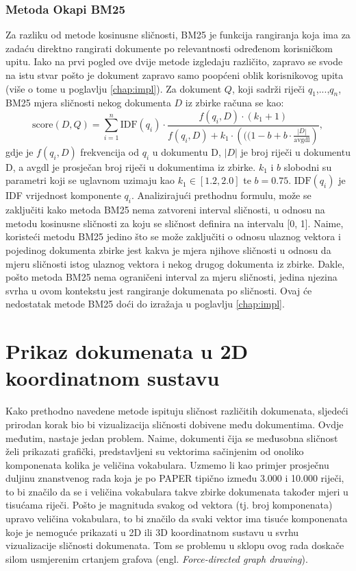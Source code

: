 \documentclass[times, utf8, zavrsni]{fer}
\begin{document}
\subsection{Metoda Okapi BM25}
Za razliku od metode kosinusne sličnosti, BM25 je funkcija rangiranja koja ima za zadaću direktno rangirati dokumente po relevantnosti određenom korisničkom upitu. Iako na prvi pogled ove dvije metode izgledaju različito, zapravo se svode na istu stvar pošto je dokument zapravo samo poopćeni oblik korisnikovog upita (više o tome u poglavlju \ref{chap:impl}).
Za dokument $Q$, koji sadrži riječi $q_{1}$,...,$q_{n}$, BM25 mjera sličnosti nekog dokumenta $D$ iz zbirke računa se kao:
\begin{equation}
{\displaystyle {\text{score}}(D,Q)=\sum _{i=1}^{n}{\text{IDF}}(q_{i})\cdot {\frac {f(q_{i},D)\cdot (k_{1}+1)}{f(q_{i},D)+k_{1}\cdot \left(((1-b+b\cdot {\frac {|D|}{\text{avgdl}}}\right)}},}
\end{equation}
gdje je ${\displaystyle f(q_{i},D)}$	 frekvencija od ${\displaystyle q_{i}}$ u dokumentu D, ${\displaystyle |D|}$ je broj riječi u dokumentu D, a avgdl je prosječan broj riječi u dokumentima iz zbirke. ${\displaystyle k_{1}}$ i $b$ slobodni su parametri koji se uglavnom uzimaju kao ${\displaystyle k_{1}\in [1.2,2.0]}$ te ${\displaystyle b=0.75}.{\displaystyle {\text{ IDF}}(q_{i})}$ je IDF vrijednost komponente ${\displaystyle q_{i}}$.
Analizirajući prethodnu formulu, može se zaključiti kako metoda BM25 nema zatvoreni interval sličnosti, u odnosu na metodu kosinusne sličnosti za koju se sličnost definira na intervalu [0, 1]. Naime, koristeći metodu BM25 jedino što se može zaključiti o odnosu ulaznog vektora i pojedinog dokumenta zbirke jest kakva je mjera njihove sličnosti u odnosu da mjeru sličnosti istog ulaznog vektora i nekog drugog dokumenta iz zbirke. Dakle, pošto metoda BM25 nema ograničeni interval za mjeru sličnosti, jedina njezina svrha u ovom kontekstu jest rangiranje dokumenata po sličnosti. Ovaj će nedostatak metode BM25 doći do izražaja u poglavlju \ref{chap:impl}.

\chapter{Prikaz dokumenata u 2D koordinatnom sustavu}
Kako prethodno navedene metode ispituju sličnost različitih dokumenata, sljedeći prirodan korak bio bi vizualizacija  sličnosti dobivene među dokumentima. Ovdje međutim, nastaje jedan problem. Naime, dokumenti čija se međusobna sličnost želi prikazati grafički, predstavljeni su vektorima sačinjenim od onoliko komponenata kolika je veličina vokabulara. Uzmemo li kao primjer prosječnu duljinu znanstvenog rada koja je po PAPER tipično između 3.000 i 10.000 riječi, to bi značilo da se i veličina vokabulara takve zbirke dokumenata također mjeri u tisućama riječi. Pošto je magnituda svakog od vektora (tj. broj komponenata) upravo veličina vokabulara, to bi značilo da svaki vektor ima tisuće komponenata koje je nemoguće prikazati u 2D ili 3D koordinatnom sustavu u svrhu vizualizacije sličnosti dokumenata. Tom se problemu u sklopu ovog rada doskače silom usmjerenim crtanjem grafova (engl. \textit{Force-directed graph drawing}).
\end{document}
